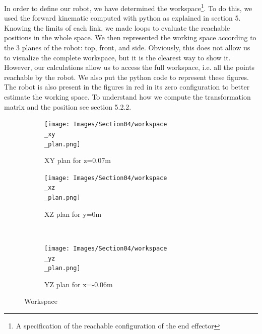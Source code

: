 In order to define our robot, we have determined the \gls{workspace}\footnote{A specification of the reachable configuration of the end effector}. To do this, we used the forward kinematic computed with python as explained in section 5. Knowing the limits of each link, we made loops to evaluate the reachable positions in the whole space. We then represented the working space according to the 3 planes of the robot: top, front, and side. Obviously, this does not allow us to visualize the complete workspace, but it is the clearest way to show it. However, our calculations allow us to access the full workspace, i.e. all the points reachable by the robot. We also put the python code to represent these figures. The robot is also present in the figures in red in its zero configuration to better estimate the working space. To understand how we compute the transformation matrix and the position see section 5.2.2.
\begin{figure}[H]
    \begin{subfigure}{.5\linewidth}
        \centering
        \texttt{[image: Images/Section04/workspace\\\_xy\\\_plan.png]}
        \caption{XY plan for z=0.07m}
        \label{fig:WorkspaceXY}
    \end{subfigure}%
    \begin{subfigure}{.5\linewidth}
        \centering
        \texttt{[image: Images/Section04/workspace\\\_xz\\\_plan.png]}
        \caption{XZ plan for y=0m}
        \label{fig:WorkspaceXZ}
    \end{subfigure}\\[1ex]
    \begin{subfigure}{\linewidth}
        \centering
        \texttt{[image: Images/Section04/workspace\\\_yz\\\_plan.png]}
        \caption{YZ plan for x=-0.06m}
        \label{fig:WorkspaceYZ}
        \end{subfigure}
        \caption{Workspace}
        \label{fig:Workspace}
\end{figure}
\FloatBarrier

